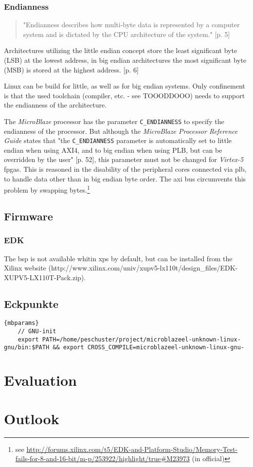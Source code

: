 \subsection{Endianness}

\begin{quote}
 "Endianness describes how multi-byte data is represented by a computer system and is dictated by the CPU architecture of the system." \cite{intel_endiannness}[p. 5]
\end{quote}

Architectures utilizing the little endian concept store the least significant byte (LSB) at the lowest address, in big endian architectures the most significant byte (MSB) is stored at the highest address. \cite{intel_endiannness}[p. 6]

Linux can be build for little, as well as for big endian systems. Only confinement is that the used toolchain (compiler, etc. - see TOOODDOOO) needs to support the endianness of the architecture.

The \textit{MicroBlaze} processor has the parameter \texttt{C\_ENDIANNESS} to specify the endianness of the processor. But although the \textit{MicroBlaze Processor Reference Guide} states that "the \texttt{C\_ENDIANNESS} parameter is automatically set to little endian when using AXI4, and to big endian when using PLB, but can be overridden by the user" \cite{mb_ref}[p. 52], this parameter must not be changed for \textit{Virtex-5} \gls{fpga}s. This is reasoned in the disability of the peripheral cores connected via \gls{plb}, to handle data other than in big endian byte order. The \gls{axi} bus circumvents this problem by swapping bytes.\footnote{see \url{http://forums.xilinx.com/t5/EDK-and-Platform-Studio/Memory-Test-fails-for-8-and-16-bit/m-p/253922/highlight/true\#M23973} (in official)}

\section{Firmware}

\subsection{EDK}

The \gls{bsp} is not available whitin \gls{xps} by default, but can be installed from the Xilinx website (http://www.xilinx.com/univ/xupv5-lx110t/design\_files/EDK-XUPV5-LX110T-Pack.zip).

\section{Eckpunkte}

\begin{lstlisting}[caption=Microblaze parameters]{mbparams}
	// GNU-init
	export PATH=/home/peschuster/project/microblazeel-unknown-linux-gnu/bin:$PATH && export CROSS_COMPILE=microblazeel-unknown-linux-gnu-
\end{lstlisting}



\chapter{Evaluation}

\chapter{Outlook}
